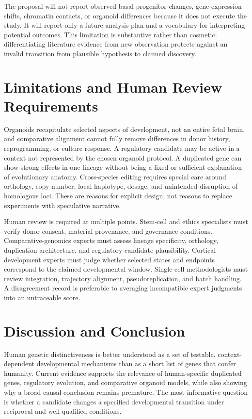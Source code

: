 \documentclass[conference]{IEEEtran}
\begin{document}
The proposal will not report observed basal-progenitor changes, gene-expression shifts, chromatin contacts, or organoid differences because it does not execute the study. It will report only a future analysis plan and a vocabulary for interpreting potential outcomes. This limitation is substantive rather than cosmetic: differentiating literature evidence from new observation protects against an invalid transition from plausible hypothesis to claimed discovery.

\section{Limitations and Human Review Requirements}

Organoids recapitulate selected aspects of development, not an entire fetal brain, and comparative alignment cannot fully remove differences in donor history, reprogramming, or culture response. A regulatory candidate may be active in a context not represented by the chosen organoid protocol. A duplicated gene can show strong effects in one lineage without being a fixed or sufficient explanation of evolutionary anatomy. Cross-species editing requires special care around orthology, copy number, local haplotype, dosage, and unintended disruption of homologous loci. These are reasons for explicit design, not reasons to replace experiments with speculative narrative.

Human review is required at multiple points. Stem-cell and ethics specialists must verify donor consent, material provenance, and governance conditions. Comparative-genomics experts must assess lineage specificity, orthology, duplication architecture, and regulatory-candidate plausibility. Cortical-development experts must judge whether selected states and endpoints correspond to the claimed developmental window. Single-cell methodologists must review integration, trajectory alignment, pseudoreplication, and batch handling. A disagreement record is preferable to averaging incompatible expert judgments into an untraceable score.

\section{Discussion and Conclusion}

Human genetic distinctiveness is better understood as a set of testable, context-dependent developmental mechanisms than as a short list of genes that confer humanity. Current evidence supports the relevance of human-specific duplicated genes, regulatory evolution, and comparative organoid models, while also showing why a broad causal conclusion remains premature. The most informative question is whether a candidate changes a specified developmental transition under reciprocal and well-qualified conditions.
\end{document}
